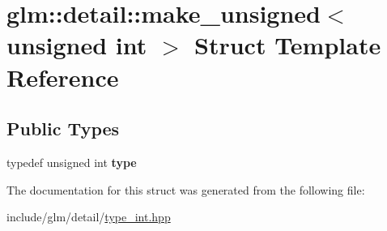 \hypertarget{structglm_1_1detail_1_1make__unsigned_3_01unsigned_01int_01_4}{}\section{glm\+:\+:detail\+:\+:make\+\_\+unsigned$<$ unsigned int $>$ Struct Template Reference}
\label{structglm_1_1detail_1_1make__unsigned_3_01unsigned_01int_01_4}
\subsection*{Public Types}
\begin{DoxyCompactItemize}
\item 
\mbox{\label{structglm_1_1detail_1_1make__unsigned_3_01unsigned_01int_01_4_aea3e796456b317dd2247889d3fbb9d68}} 
typedef unsigned int {\bfseries type}
\end{DoxyCompactItemize}


The documentation for this struct was generated from the following file\+:\begin{DoxyCompactItemize}
\item 
include/glm/detail/\hyperlink{type__int_8hpp}{type\+\_\+int.\+hpp}\end{DoxyCompactItemize}
